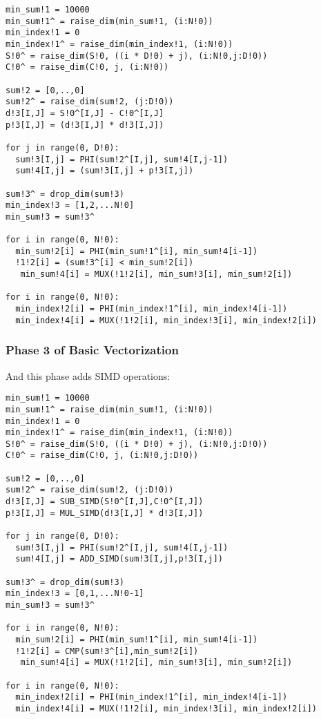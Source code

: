 \begin{verbatim}
min_sum!1 = 10000
min_sum!1^ = raise_dim(min_sum!1, (i:N!0))
min_index!1 = 0
min_index!1^ = raise_dim(min_index!1, (i:N!0))
S!0^ = raise_dim(S!0, ((i * D!0) + j), (i:N!0,j:D!0))
C!0^ = raise_dim(C!0, j, (i:N!0))

sum!2 = [0,..,0]
sum!2^ = raise_dim(sum!2, (j:D!0))
d!3[I,J] = S!0^[I,J] - C!0^[I,J]
p!3[I,J] = (d!3[I,J] * d!3[I,J])

for j in range(0, D!0):
  sum!3[I,j] = PHI(sum!2^[I,j], sum!4[I,j-1])       
  sum!4[I,j] = (sum!3[I,j] + p!3[I,j])

sum!3^ = drop_dim(sum!3)     
min_index!3 = [1,2,...N!0]   
min_sum!3 = sum!3^

for i in range(0, N!0):
  min_sum!2[i] = PHI(min_sum!1^[i], min_sum!4[i-1]) 
  !1!2[i] = (sum!3^[i] < min_sum!2[i])
   min_sum!4[i] = MUX(!1!2[i], min_sum!3[i], min_sum!2[i])
    
for i in range(0, N!0):
  min_index!2[i] = PHI(min_index!1^[i], min_index!4[i-1])  
  min_index!4[i] = MUX(!1!2[i], min_index!3[i], min_index!2[i])

\end{verbatim}

\subsubsection{Phase 3 of Basic Vectorization}

And this phase adds SIMD operations:
\begin{verbatim}
min_sum!1 = 10000
min_sum!1^ = raise_dim(min_sum!1, (i:N!0))
min_index!1 = 0
min_index!1^ = raise_dim(min_index!1, (i:N!0))
S!0^ = raise_dim(S!0, ((i * D!0) + j), (i:N!0,j:D!0))
C!0^ = raise_dim(C!0, j, (i:N!0,j:D!0))

sum!2 = [0,..,0]
sum!2^ = raise_dim(sum!2, (j:D!0))
d!3[I,J] = SUB_SIMD(S!0^[I,J],C!0^[I,J])
p!3[I,J] = MUL_SIMD(d!3[I,J] * d!3[I,J])

for j in range(0, D!0):
  sum!3[I,j] = PHI(sum!2^[I,j], sum!4[I,j-1])       
  sum!4[I,j] = ADD_SIMD(sum!3[I,j],p!3[I,j])

sum!3^ = drop_dim(sum!3)     
min_index!3 = [0,1,...N!0-1]   
min_sum!3 = sum!3^

for i in range(0, N!0):
  min_sum!2[i] = PHI(min_sum!1^[i], min_sum!4[i-1]) 
  !1!2[i] = CMP(sum!3^[i],min_sum!2[i])
   min_sum!4[i] = MUX(!1!2[i], min_sum!3[i], min_sum!2[i])
    
for i in range(0, N!0):
  min_index!2[i] = PHI(min_index!1^[i], min_index!4[i-1])  
  min_index!4[i] = MUX(!1!2[i], min_index!3[i], min_index!2[i])
\end{verbatim}

